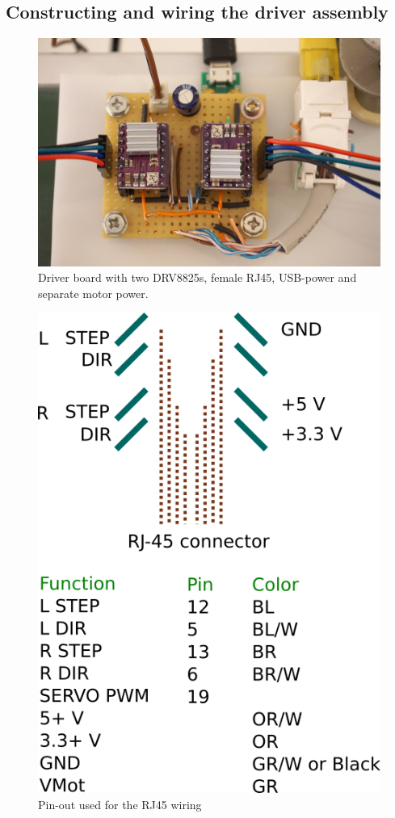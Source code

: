 \documentclass[a4paper,10pt]{article}
\begin{document}
\subsection{Constructing and wiring the driver assembly}

\begin{figure}[h!]
  \centering
  \includegraphics{img/driverboard.jpg}
  \caption{Driver board with two DRV8825s, female RJ45, USB-power and separate motor power.}
  \label{fig:driverboard}
\end{figure}



\begin{figure}[h!]
  \centering
  \includegraphics[scale=.75]{img/pinout.png}
  \caption{Pin-out used for the RJ45 wiring}
  \label{fig:pinout}
\end{figure}

\end{document}
